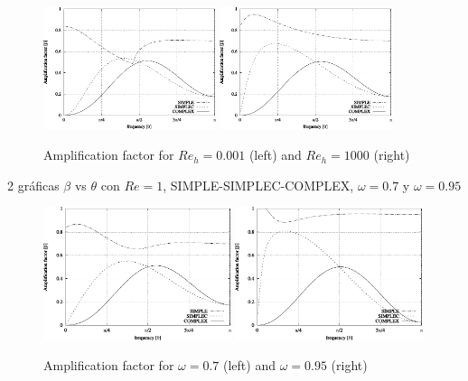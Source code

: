 \documentclass[final,3p,times,10pt,onecolumn]{myElsarticle}
\numberwithin{equation}{section}
\begin{document}
\begin{figure}[H]
    \centering
    \includegraphics[width=0.45\textwidth]{fig/Re0001} \hspace{1cm}
    \includegraphics[width=0.45\textwidth]{fig/Re1000}
    \caption{Amplification factor for $Re_h=0.001$ (left) and $Re_h=1000$ (right)}
    \label{fig:1a}
\end{figure}
    
2 gráficas $\beta$ vs $\theta$ con $Re=1$, SIMPLE-SIMPLEC-COMPLEX, $\omega=0.7$ y $\omega=0.95$
    
    \begin{figure}[H]
        \centering
        \includegraphics[width=0.49\textwidth]{fig/w07}
        \includegraphics[width=0.49\textwidth]{fig/w095}
        \caption{Amplification factor for $\omega=0.7$ (left) and $\omega=0.95$ (right)}
        \label{fig:1b}
    \end{figure}    
    
\end{document}
